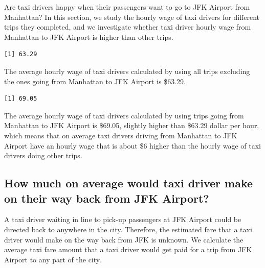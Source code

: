 \documentclass[12pt,twoside]{reedthesis}
\theoremstyle{definition}
\theoremstyle{definition}
\theoremstyle{definition}
\theoremstyle{remark}
\begin{document}
Are taxi drivers happy when their passengers want to go to JFK Airport
from Manhattan? In this section, we study the hourly wage of taxi
drivers for different trips they completed, and we investigate whether
taxi driver hourly wage from Manhattan to JFK Airport is higher than
other trips.
\begin{verbatim}
[1] 63.29
\end{verbatim}
The average hourly wage of taxi drivers calculated by using all trips
excluding the ones going from Manhattan to JFK Airport is \$63.29.
\begin{verbatim}
[1] 69.05
\end{verbatim}
The average hourly wage of taxi drivers calculated by using trips going
from Manhattan to JFK Airport is \$69.05, slightly higher than \$63.29
dollar per hour, which means that on average taxi drivers driving from
Manhattan to JFK Airport have an hourly wage that is about \$6 higher
than the hourly wage of taxi drivers doing other trips.

\subsection{How much on average would taxi driver make on their way back
from JFK
Airport?}\label{how-much-on-average-would-taxi-driver-make-on-their-way-back-from-jfk-airport}

A taxi driver waiting in line to pick-up passengers at JFK Airport could
be directed back to anywhere in the city. Therefore, the estimated fare
that a taxi driver would make on the way back from JFK is unknown. We
calculate the average taxi fare amount that a taxi driver would get paid
for a trip from JFK Airport to any part of the city.
\end{document}
